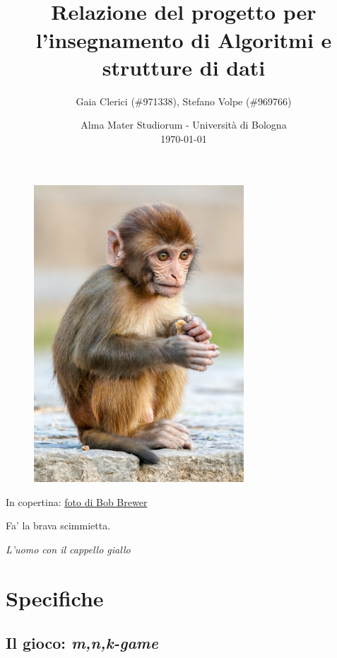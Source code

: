 \documentclass{article}
\title{
  \textbf{
    \fontspec[ Path = fonts/ ]{Symbola}{
      {\huge
        \symbol{"1F17C}\symbol{"1F435}\symbol{"1F17D}\symbol{"1F17A}ey
      } 
    } \\
  }
  \textbf{\large
      Relazione del progetto per l'insegnamento di \break
      Algoritmi e strutture di dati
  }
}
\author{
  Gaia Clerici (\#971338),
  Stefano Volpe (\#969766)
}
\date{
	Alma Mater Studiorum - Universit\`a di Bologna \\
  \today
}
\begin{document}
\maketitle
\thispagestyle{empty}

\begin{figure}[h]
  \includegraphics[width=0.7\textwidth]{monkey}
  \centering
\end{figure}

\pagebreak

\thispagestyle{empty}
\vspace*{\fill}

\noindent
In copertina: \href{https://unsplash.com/photos/daC7ji1EMHM}{foto di
Bob Brewer}

\pagebreak

\tableofcontents

\pagebreak

\epigraph{Fa' la brava scimmietta.}{\textit{L'uomo con il cappello giallo}}

\section{Specifiche}

\subsection{Il gioco: \emph{m,n,k-game}}
\end{document}
